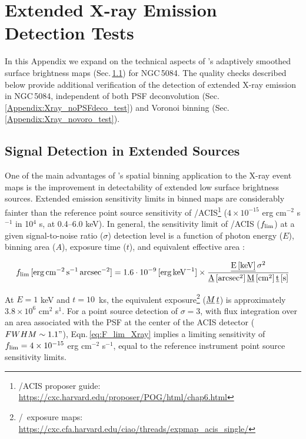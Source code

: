 \documentclass[modern]{CORE-AAS/aastex631}
\begin{document}
\section{Extended X-ray Emission Detection Tests}
\label{Appendix:xray_tests}

In this Appendix we expand on the technical aspects of \SAUNAS's \citep{borlaff+2024apj967_169} adaptively smoothed surface brightness maps (Sec.\,\ref{Appendix:xray_SNR}) for NGC\,5084. The quality checks described below provide additional verification of the detection of  extended X-ray emission in NGC\,5084, independent of both PSF deconvolution (Sec.\,\ref{Appendix:Xray_noPSFdeco_test}) and Voronoi binning (Sec.\,\ref{Appendix:Xray_novoro_test}).

\subsection{Signal Detection in Extended Sources}
\label{Appendix:xray_SNR}

One of the main advantages of \SAUNAS's spatial binning application to the X-ray event maps is the improvement in detectability of extended low surface brightness sources. Extended emission sensitivity limits in binned maps are considerably fainter than the reference point source sensitivity of \Chandra/ACIS\footnote{\Chandra/ACIS proposer guide: \url{https://cxc.harvard.edu/proposer/POG/html/chap6.html}} ($4\times10^{-15}$ erg cm$^{-2}$ s$^{-1}$ in 10$^4$ s, at 0.4--6.0 keV). In general, the sensitivity limit of \Chandra/ACIS ($f_{\rm lim}$) at a given signal-to-noise ratio ($\sigma$) detection level is a function of photon energy ($E$), binning area ($A$), exposure time ($t$), and equivalent effective area \citep[$M$, which has a complex variation with energy, see Fig.\,6 in][]{evans+2010apj189_37}:

\begin{equation}
\label{eq:F_lim_Xray}
f_{\rm{lim}}\,[\rm{erg}\,\rm{cm}^{-2}\,\rm{s}^{-1}\,\rm{arcsec}^{-2} ] =\\ 1.6\cdot10^{-9}\,[\rm{erg} \, \rm{keV}^{-1}] \times\frac{\emph{E\,[\rm{keV}]}\,\sigma^2}{\emph{A}\,[arcsec^2]\,\emph{M}\,[cm^2]\,\emph{t}\,[s]}
\end{equation}

At $E=1$ keV and $t=10$~ks, the equivalent exposure\footnote{\ciao/\Chandra\ exposure maps: \url{https://cxc.cfa.harvard.edu/ciao/threads/expmap_acis_single/}} ($\emph{M}\,\emph{t}$) is approximately $3.8\times10^{6}$ cm$^{2}$ s$^{1}$. For a point source detection of $\sigma=3$, with flux integration over an area associated with the PSF at the center of the ACIS detector ($FWHM\sim1.1"$), Eqn.\,\ref{eq:F_lim_Xray} implies a limiting sensitivity of $f_{\rm{lim}} = 4\times10^{-15}$ erg cm$^{-2}$ s$^{-1}$, equal to the reference instrument point source sensitivity limits.
\end{document}
